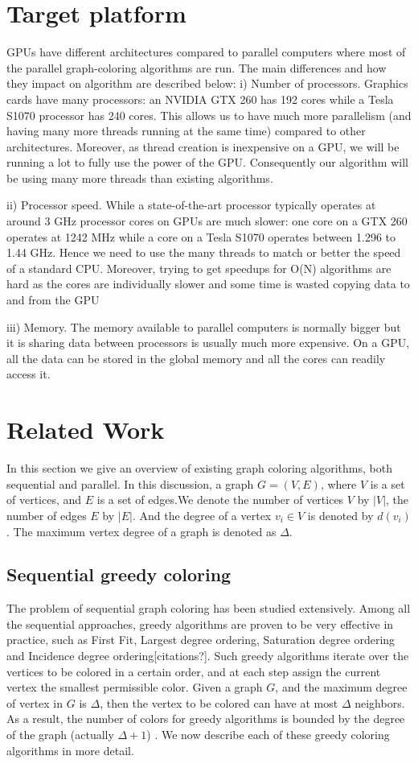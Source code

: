 \documentclass[preprint]{sigplanconf}
\begin{document}
\section{Target platform}
GPUs have different architectures compared to parallel computers where most of the parallel graph-coloring algorithms are run. The main differences and how they impact on algorithm are described below:
i) Number of processors. Graphics cards have many processors: an NVIDIA GTX 260 has 192 cores while a Tesla S1070 processor has 240 cores. This allows us to have much more parallelism (and having many more threads running at the same time) compared to other architectures. Moreover, as thread creation is inexpensive on a GPU, we will be running a lot to fully use the power of the GPU. Consequently our algorithm will be using many more threads than existing algorithms.

ii) Processor speed. While a state-of-the-art processor typically operates at around 3 GHz processor cores on GPUs are much slower: one core on a GTX 260 operates at 1242 MHz while a core on a Tesla S1070 operates between 1.296 to 1.44  GHz. Hence we need to use the many threads to match or better the speed of a standard CPU. Moreover, trying to get speedups for  O(N) algorithms are hard as the cores are individually slower and some time is wasted copying data to and from the GPU

iii) Memory. The memory available to parallel computers is normally bigger but it is sharing data between processors is usually much more expensive. On a GPU, all the data can be stored in the global memory and all the cores can readily access it.
\section{ Related Work}
In this section we give an overview of existing graph coloring algorithms, both sequential and parallel.  In this discussion, a graph $G=(V,E)$, where $V$ is a set of vertices, and $E$ is a set of edges.We denote the number of vertices $V$ by $|V|$, the number of edges $E$ by $|E|$. And the degree of a vertex $v_i \in V$ is denoted by $d(v_i)$. The maximum vertex degree of a graph is denoted as $\Delta$.

\subsection{Sequential greedy coloring}

The problem of sequential graph coloring has been studied extensively. Among all the sequential approaches, greedy algorithms are proven to be very effective in practice, such as First Fit, Largest degree ordering, Saturation degree ordering and Incidence degree ordering[citations?]. Such greedy algorithms iterate over the vertices to be colored in a certain order, and at each step assign the current vertex the smallest permissible color. Given a graph $G$, and the maximum degree of vertex in $G$ is $\Delta$, then the vertex to be colored can have at most $\Delta$ neighbors. As a result, the number of colors for greedy algorithms is bounded by the degree of the graph (actually $\Delta+1$) \cite{allwright1995comparison}.  We now describe each of these greedy coloring algorithms in more detail.
\end{document}

